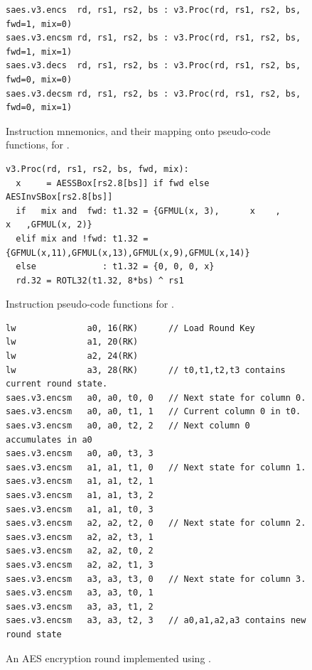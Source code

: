 
\begin{figure}[!h]
\begin{lstlisting}[language=pseudo,style=block]
saes.v3.encs  rd, rs1, rs2, bs : v3.Proc(rd, rs1, rs2, bs, fwd=1, mix=0)
saes.v3.encsm rd, rs1, rs2, bs : v3.Proc(rd, rs1, rs2, bs, fwd=1, mix=1)
saes.v3.decs  rd, rs1, rs2, bs : v3.Proc(rd, rs1, rs2, bs, fwd=0, mix=0)
saes.v3.decsm rd, rs1, rs2, bs : v3.Proc(rd, rs1, rs2, bs, fwd=0, mix=1)
\end{lstlisting}
\caption{
  Instruction mnemonics, and their mapping onto pseudo-code functions, for .
}
\label{fig:v3:mnemonics}
\end{figure}

\begin{figure}[!h]
\begin{lstlisting}[language=pseudo,style=block]
v3.Proc(rd, rs1, rs2, bs, fwd, mix):
  x     = AESSBox[rs2.8[bs]] if fwd else AESInvSBox[rs2.8[bs]]
  if   mix and  fwd: t1.32 = {GFMUL(x, 3),      x    ,      x   ,GFMUL(x, 2)}
  elif mix and !fwd: t1.32 = {GFMUL(x,11),GFMUL(x,13),GFMUL(x,9),GFMUL(x,14)}
  else             : t1.32 = {0, 0, 0, x}
  rd.32 = ROTL32(t1.32, 8*bs) ^ rs1
\end{lstlisting}
\caption{
  Instruction pseudo-code functions for .
}
\label{fig:v3:pseudo}
\end{figure}

\begin{figure}[!h]
\begin{lstlisting}[language=pseudo,style=block]
lw              a0, 16(RK)      // Load Round Key
lw              a1, 20(RK)
lw              a2, 24(RK)
lw              a3, 28(RK)      // t0,t1,t2,t3 contains current round state.
saes.v3.encsm   a0, a0, t0, 0   // Next state for column 0.
saes.v3.encsm   a0, a0, t1, 1   // Current column 0 in t0.
saes.v3.encsm   a0, a0, t2, 2   // Next column 0 accumulates in a0
saes.v3.encsm   a0, a0, t3, 3
saes.v3.encsm   a1, a1, t1, 0   // Next state for column 1.
saes.v3.encsm   a1, a1, t2, 1
saes.v3.encsm   a1, a1, t3, 2
saes.v3.encsm   a1, a1, t0, 3
saes.v3.encsm   a2, a2, t2, 0   // Next state for column 2.
saes.v3.encsm   a2, a2, t3, 1
saes.v3.encsm   a2, a2, t0, 2
saes.v3.encsm   a2, a2, t1, 3
saes.v3.encsm   a3, a3, t3, 0   // Next state for column 3.
saes.v3.encsm   a3, a3, t0, 1
saes.v3.encsm   a3, a3, t1, 2
saes.v3.encsm   a3, a3, t2, 3   // a0,a1,a2,a3 contains new round state
\end{lstlisting}
\caption{
  An AES encryption round implemented using .
}
\label{fig:v3:round}
\end{figure}

